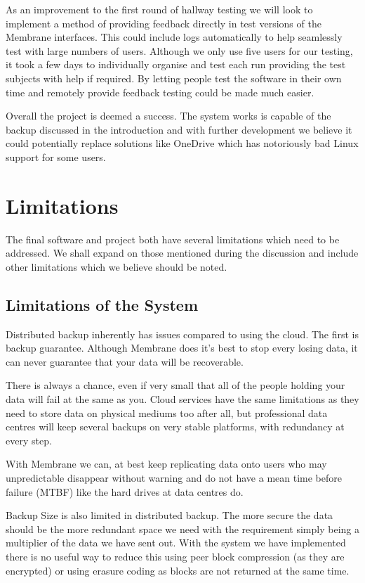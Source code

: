 \documentclass[11pt, a4paper, twoside]{report}
\begin{document}
As an improvement to the first round of hallway testing we will look to implement a method of providing feedback directly in test versions of the Membrane interfaces. This could include logs automatically to help seamlessly test with large numbers of users. Although we only use five users for our testing, it took a few days to individually organise and test each run providing the test subjects with help if required. By letting people test the software in their own time and remotely provide feedback testing could be made much easier.

Overall the project is deemed a success. The system works is capable of the backup discussed in the introduction and with further development we believe it could potentially replace solutions like OneDrive which has notoriously bad Linux support for some users.

\section{Limitations}

The final software and project both have several limitations which need to be addressed. We shall expand on those mentioned during the discussion and include other limitations which we believe should be noted.

\subsection{Limitations of the System}

Distributed backup inherently has issues compared to using the cloud. The first is backup guarantee. Although Membrane does it's best to stop every losing data, it can never guarantee that your data will be recoverable.

There is always a chance, even if very small that all of the people holding your data will fail at the same as you. Cloud services have the same limitations as they need to store data on physical mediums too after all, but professional data centres will keep several backups on very stable platforms, with redundancy at every step.

With Membrane we can, at best keep replicating data onto users who may unpredictable disappear without warning and do not have a mean time before failure (MTBF) like the hard drives at data centres do.

Backup Size is also limited in distributed backup. The more secure the data should be the more redundant space we need with the requirement simply being a multiplier of the data we have sent out. With the system we have implemented there is no useful way to reduce this using peer block compression (as they are encrypted) or using erasure coding as blocks are not returned at the same time.
\end{document}
